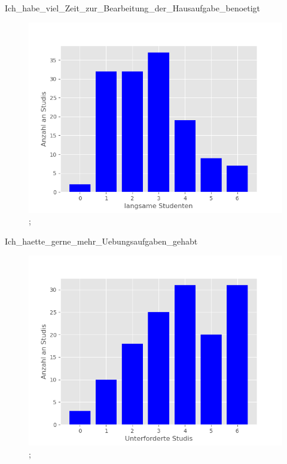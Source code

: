 \documentclass[10pt]{beamer}
\begin{document}
\begin{frame}[fragile]{Ich_habe_viel_Zeit_zur_Bearbeitung_der_Hausaufgabe_benoetigt} 
 \begin{figure}
 \includegraphics[width= 0.9\linewidth]{./PDFcreater/Plots/Ich_habe_viel_Zeit_zur_Bearbeitung_der_Hausaufgabe_benoetigt.png};
 \end{figure}
 \end{frame}
\begin{frame}[fragile]{Ich_haette_gerne_mehr_Uebungsaufgaben_gehabt} 
 \begin{figure}
 \includegraphics[width= 0.9\linewidth]{./PDFcreater/Plots/Ich_haette_gerne_mehr_Uebungsaufgaben_gehabt.png};
 \end{figure}
 \end{frame}
\end{document}
